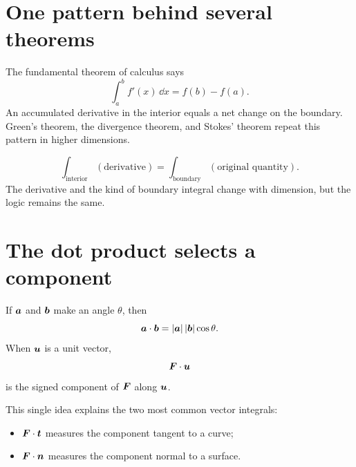 \documentclass[11pt,a4paper]{article}
\begin{document}
\tableofcontents
\clearpage

\section{One pattern behind several theorems}

The fundamental theorem of calculus says
\[
\int_a^b f'(x)\,\dd x=f(b)-f(a).
\]
An accumulated derivative in the interior equals a net change on the boundary. Green's theorem, the divergence theorem, and Stokes' theorem repeat this pattern in higher dimensions.

\begin{resultbox}
\[
\boxed{\int_{\text{interior}}(\text{derivative})
=\int_{\text{boundary}}(\text{original quantity}).}
\]
The derivative and the kind of boundary integral change with dimension, but the logic remains the same.
\end{resultbox}

\section{The dot product selects a component}

If $\bm{a}$ and $\bm{b}$ make an angle $\theta$, then
\[
\bm{a}\cdot\bm{b}=|\bm{a}|\,|\bm{b}|\cos\theta.
\]
When $\bm{u}$ is a unit vector,
\[
\bm{F}\cdot\bm{u}
\]
is the signed component of $\bm{F}$ along $\bm{u}$.

This single idea explains the two most common vector integrals:

\begin{itemize}
\item $\bm{F}\cdot\bm{t}$ measures the component tangent to a curve;
\item $\bm{F}\cdot\bm{n}$ measures the component normal to a surface.
\end{itemize}

\begin{center}
\end{center}
\end{document}
